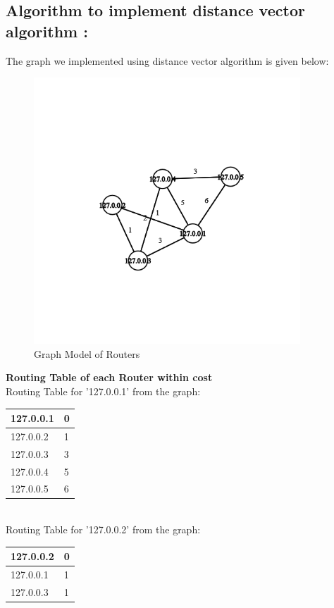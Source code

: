 \documentclass[11pt]{article}
\begin{document}
\subsection{Algorithm to implement distance vector algorithm : }
The graph we implemented using distance vector algorithm is given below:
 \begin{figure}[!h]
\centering
\includegraphics[width=\textwidth,height=10cm,keepaspectratio]{graph.png}
\caption{Graph Model of Routers}
\end{figure}
\FloatBarrier

\textbf{Routing Table of each Router within cost}\\[24pt]

Routing Table for '127.0.0.1' from the graph:\\[12pt] 
\begin{tabular}{ | m{8em} | m{5cm}| } 
  \hline
   127.0.0.1 & 0\\ 
  \hline
  127.0.0.2 & 1\\ 
  \hline
  127.0.0.3 & 3\\ 
  \hline
  127.0.0.4 & 5\\ 
  \hline
  127.0.0.5 & 6\\ 
  \hline
\end{tabular}\\[24pt]


Routing Table for '127.0.0.2' from the graph:\\[12pt] 
\begin{tabular}{ | m{8em} | m{5cm}| } 
    \hline
   127.0.0.2 & 0\\ 
  \hline
  127.0.0.1 & 1\\ 
  \hline
  127.0.0.3 & 1\\ 
  \hline
\end{tabular}\\[24pt]
\end{document}
